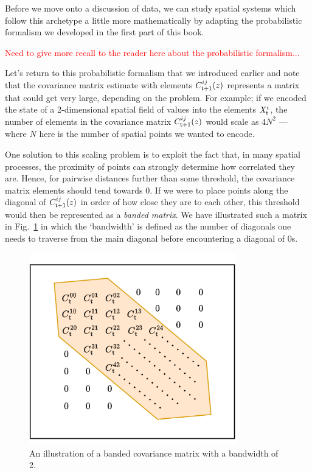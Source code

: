 Before we move onto a discussion of data, we can study spatial systems which follow this archetype a little more mathematically by adapting the probabilistic formalism we developed in the first part of this book. 

\textcolor{red}{Need to give more recall to the reader here about the probabilistic formalism...}

Let's return to this probabilistic formalism that we introduced earlier and note that the covariance matrix estimate with elements $C^{ij}_{{\sf t}+1}(z)$ represents a matrix that could get very large, depending on the problem. For example; if we encoded the state of a 2-dimensional spatial field of values into the elements $X^i_{\sf t}$, the number of elements in the covariance matrix $C^{ij}_{{\sf t}+1}(z)$ would scale as $4N^2$ --- where $N$ here is the number of spatial points we wanted to encode. 

One solution to this scaling problem is to exploit the fact that, in many spatial processes, the proximity of points can strongly determine how correlated they are. Hence, for pairwise distances further than some threshold, the covariance matrix elements should tend towards 0. If we were to place points along the diagonal of $C^{ij}_{{\sf t}+1}(z)$ in order of how close they are to each other, this threshold would then be represented as a \emph{banded matrix}. We have illustrated such a matrix in Fig.~\ref{fig:banded-matrix} in which the `bandwidth' is defined as the number of diagonals one needs to traverse from the main diagonal before encountering a diagonal of 0s.

\begin{figure}[h]
\centering
\includegraphics[width=9cm]{images/chapter-7-banded-matrix.drawio.png}
\caption{An illustration of a banded covariance matrix with a bandwidth of 2.}
\label{fig:banded-matrix}
\end{figure}

